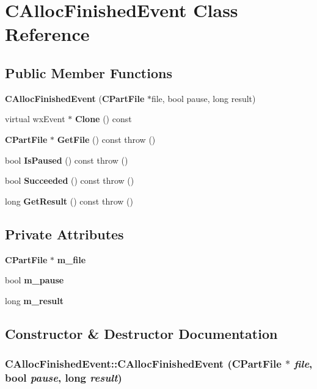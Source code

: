 \section{CAllocFinishedEvent Class Reference}
\label{classCAllocFinishedEvent}
\subsection*{Public Member Functions}
\begin{DoxyCompactItemize}
\item 
{\bf CAllocFinishedEvent} ({\bf CPartFile} $\ast$file, bool pause, long result)
\item 
virtual wxEvent $\ast$ {\bf Clone} () const 
\item 
{\bf CPartFile} $\ast$ {\bf GetFile} () const   throw ()
\item 
bool {\bf IsPaused} () const   throw ()
\item 
bool {\bf Succeeded} () const   throw ()
\item 
long {\bf GetResult} () const   throw ()
\end{DoxyCompactItemize}
\subsection*{Private Attributes}
\begin{DoxyCompactItemize}
\item 
{\bf CPartFile} $\ast$ {\bf m\_\-file}\label{classCAllocFinishedEvent_a14843c973173fa9249de94a73a36c393}

\item 
bool {\bf m\_\-pause}\label{classCAllocFinishedEvent_ac10d0b9d06dd73d9533e90271ed00c91}

\item 
long {\bf m\_\-result}\label{classCAllocFinishedEvent_a4c8e48a9d0fac4ee4f9c9687f8979743}

\end{DoxyCompactItemize}


\subsection{Constructor \& Destructor Documentation}
\subsubsection[{CAllocFinishedEvent}]{\setlength{\rightskip}{0pt plus 5cm}CAllocFinishedEvent::CAllocFinishedEvent ({\bf CPartFile} $\ast$ {\em file}, \/  bool {\em pause}, \/  long {\em result})\hspace{0.3cm}{\ttfamily  [inline]}}\label{classCAllocFinishedEvent_a5baa394172664fbd4e5941977b63f394}


